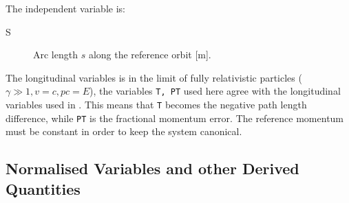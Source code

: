 The independent variable is:
\begin{description}
\item[S]
  Arc length $s$ along the reference orbit [m].
\end{description}

The longitudinal variables is in the limit of fully relativistic particles
($\gamma \gg 1, v = c, p c = E$),
the variables \texttt{T, PT} used here agree with the longitudinal variables
used in .
This means that \texttt{T} becomes the negative path length difference,
while \texttt{PT} is the fractional momentum error.
The reference momentum must be constant in order to keep the system 
canonical.

\subsection{Normalised Variables and other Derived Quantities}
\label{sec:normal}
